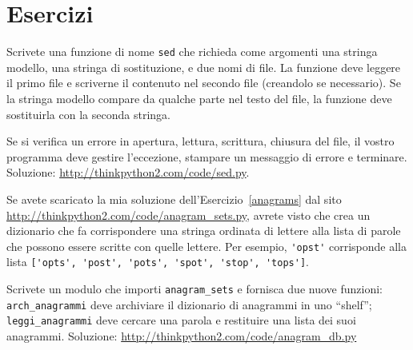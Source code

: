 \documentclass[10pt]{book}
\begin{document}
\section{Esercizi}

\begin{exercise}

Scrivete una funzione di nome {\tt sed} che richieda come argomenti una stringa modello, una stringa di sostituzione, e due nomi di file. La funzione deve leggere il primo file e scriverne il contenuto nel secondo file (creandolo se necessario). Se la stringa modello compare da qualche parte nel testo del file, la funzione deve sostituirla con la seconda stringa.

Se si verifica un errore in apertura, lettura, scrittura, chiusura del file, il vostro programma deve gestire l'eccezione, stampare un messaggio di errore e terminare. Soluzione: \url{http://thinkpython2.com/code/sed.py}.

\end{exercise}

\vspace{0.2in}
\begin{exercise}

Se avete scaricato la mia soluzione dell'Esercizio~\ref{anagrams} dal sito
\url{http://thinkpython2.com/code/anagram_sets.py}, avrete visto che crea un dizionario che fa corrispondere una stringa ordinata di lettere alla lista di parole che possono essere scritte con quelle lettere. Per esempio, \verb"'opst'" corrisponde alla lista \verb"['opts', 'post', 'pots', 'spot', 'stop', 'tops']".

Scrivete un modulo che importi \verb"anagram_sets" e fornisca due nuove funzioni: \verb"arch_anagrammi" deve archiviare il dizionario di anagrammi in uno ``shelf''; \verb"leggi_anagrammi" deve cercare una parola e restituire una lista dei suoi anagrammi. Soluzione: \url{http://thinkpython2.com/code/anagram_db.py}

\end{exercise}
\end{document}
